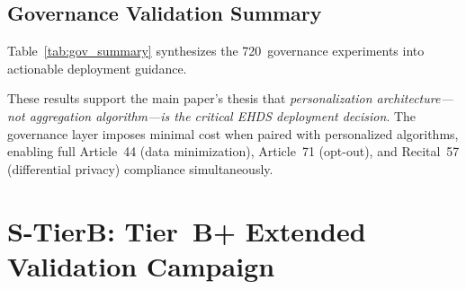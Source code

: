 \documentclass[conference]{IEEEtran}
\begin{document}
\subsection{Governance Validation Summary}
\label{sec:governance_summary}

Table~\ref{tab:gov_summary} synthesizes the 720~governance experiments into actionable deployment guidance.

\begin{table}[htbp]
\centering
\caption{Governance Validation: Summary of 720 Experiments}
\label{tab:gov_summary}
\end{table}

\noindent These results support the main paper's thesis that \textit{personalization architecture---not aggregation algorithm---is the critical EHDS deployment decision}. The governance layer imposes minimal cost when paired with personalized algorithms, enabling full Article~44 (data minimization), Article~71 (opt-out), and Recital~57 (differential privacy) compliance simultaneously.

\section{S-TierB: Tier~B+ Extended Validation Campaign}
\label{sec:tier_b}
\label{app:tier_b}
\end{document}
